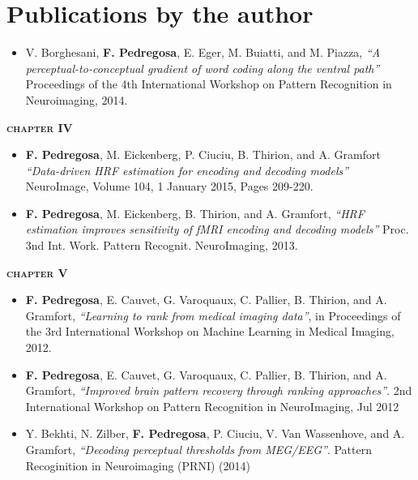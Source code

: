 \section{Publications by the author}
\begin{fullwidth}
{\center



\begin{itemize}
\item V. Borghesani, {\bf F. Pedregosa}, E. Eger, M. Buiatti, and M. Piazza, \emph{“A perceptual-to-conceptual gradient of word coding along the ventral path”} Proceedings of the 4th International Workshop on Pattern Recognition in Neuroimaging, 2014.
\end{itemize}

\vspace{10pt}
{\bf \color{msblue} \textsc{chapter IV}}
\begin{itemize}
\item {\bf F. Pedregosa}, M. Eickenberg, P. Ciuciu, B. Thirion, and A. Gramfort \emph{``Data-driven HRF estimation for encoding and decoding models''} NeuroImage, Volume 104, 1 January 2015, Pages 209-220.

\item {\bf F. Pedregosa}, M. Eickenberg, B. Thirion, and A. Gramfort, \emph{“HRF estimation improves sensitivity of fMRI encoding and decoding models”} Proc. 3nd Int. Work. Pattern Recognit. NeuroImaging, 2013.
\end{itemize}

\vspace{10pt}
{\bf \color{msblue} \textsc{chapter V}}
\begin{itemize}
\item {\bf F. Pedregosa}, E. Cauvet, G. Varoquaux, C. Pallier, B. Thirion, and A. Gramfort, \emph{``Learning to rank from medical imaging data''}, in Proceedings of the 3rd International Workshop on Machine Learning in Medical Imaging, 2012.
\item {\bf F. Pedregosa}, E. Cauvet, G. Varoquaux, C. Pallier, B. Thirion, and A. Gramfort, \emph{``Improved brain pattern recovery through ranking approaches''}. 2nd International Workshop on Pattern Recognition in NeuroImaging, Jul 2012
\item Y. Bekhti, N. Zilber, {\bf F. Pedregosa}, P. Ciuciu, V. Van Wassenhove, and A. Gramfort, \emph{``Decoding perceptual thresholds from MEG/EEG''}. Pattern Recoginition in Neuroimaging (PRNI) (2014)
\end{itemize}

}
\end{fullwidth}
